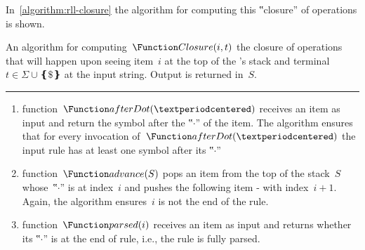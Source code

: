 In~\cref{algorithm:rll-closure} the algorithm for computing this ‟closure” of
operations is shown.

\begin{algorithm}
  \caption{\label{algorithm:rll-closure}
    An algorithm for computing~$\Function Closure(i,t)$ the closure
    of operations that will happen upon seeing item~$i$ at the top
    of the \RLLp's stack and terminal~$t∈Σ∪❴\$❵$ at the input string.
    Output is returned in~$S$.
  }
  \begin{algorithmic}
     
     
       
       
       
       
        \ENDWHILE
         
      \FI
       
    \ENDWHILE
     
  \end{algorithmic}
  \vspace{0.3ex}
  \hrule
  \vspace{0.3ex}
  \scriptsize
  \begin{enumerate}
    \item function~$\Function afterDot(·)$ receives an item as input
          and return the symbol after the ‟$·$” of the item.
          The algorithm ensures that for every invocation of~$\Function afterDot(·)$
          the input rule has at least one symbol after its ‟$·$”
    \item function~$\Function advance(S)$ pops an item from the top of
          the stack~$S$ whose~‟$·$” is at index~$i$ and pushes
          the following item - with index~$i+1$.
          Again, the algorithm ensures~$i$ is not the end of the rule.
    \item function~$\Function parsed(i)$ receives an item as input
          and returns whether its ‟$·$” is at the end of rule,
          i.e., the rule is fully parsed.
  \end{enumerate}

\end{algorithm}

